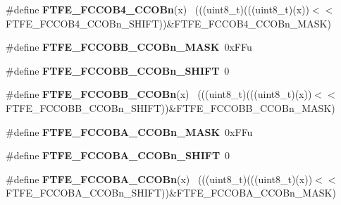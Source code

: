 \begin{DoxyCompactItemize}
\item 
\hypertarget{group___f_t_f_e___register___masks_ga478ea3d4eb6ef73b2492d90c8ad0d42f}{}\#define {\bfseries F\+T\+F\+E\+\_\+\+F\+C\+C\+O\+B4\+\_\+\+C\+C\+O\+Bn}(x)                                      ~(((uint8\+\_\+t)(((uint8\+\_\+t)(x))$<$$<$F\+T\+F\+E\+\_\+\+F\+C\+C\+O\+B4\+\_\+\+C\+C\+O\+Bn\+\_\+\+S\+H\+I\+F\+T))\&F\+T\+F\+E\+\_\+\+F\+C\+C\+O\+B4\+\_\+\+C\+C\+O\+Bn\+\_\+\+M\+A\+S\+K)\label{group___f_t_f_e___register___masks_ga478ea3d4eb6ef73b2492d90c8ad0d42f}

\item 
\hypertarget{group___f_t_f_e___register___masks_ga0c4f10213e785664769dccd3f31c19d9}{}\#define {\bfseries F\+T\+F\+E\+\_\+\+F\+C\+C\+O\+B\+B\+\_\+\+C\+C\+O\+Bn\+\_\+\+M\+A\+S\+K}~0x\+F\+Fu\label{group___f_t_f_e___register___masks_ga0c4f10213e785664769dccd3f31c19d9}

\item 
\hypertarget{group___f_t_f_e___register___masks_ga486d3dca3c7da56602168363f9c474c2}{}\#define {\bfseries F\+T\+F\+E\+\_\+\+F\+C\+C\+O\+B\+B\+\_\+\+C\+C\+O\+Bn\+\_\+\+S\+H\+I\+F\+T}~0\label{group___f_t_f_e___register___masks_ga486d3dca3c7da56602168363f9c474c2}

\item 
\hypertarget{group___f_t_f_e___register___masks_ga3a94ba085389279e61cbaad5b5281322}{}\#define {\bfseries F\+T\+F\+E\+\_\+\+F\+C\+C\+O\+B\+B\+\_\+\+C\+C\+O\+Bn}(x)                                      ~(((uint8\+\_\+t)(((uint8\+\_\+t)(x))$<$$<$F\+T\+F\+E\+\_\+\+F\+C\+C\+O\+B\+B\+\_\+\+C\+C\+O\+Bn\+\_\+\+S\+H\+I\+F\+T))\&F\+T\+F\+E\+\_\+\+F\+C\+C\+O\+B\+B\+\_\+\+C\+C\+O\+Bn\+\_\+\+M\+A\+S\+K)\label{group___f_t_f_e___register___masks_ga3a94ba085389279e61cbaad5b5281322}

\item 
\hypertarget{group___f_t_f_e___register___masks_gacec52ac0397aa60e5278a27225d3506b}{}\#define {\bfseries F\+T\+F\+E\+\_\+\+F\+C\+C\+O\+B\+A\+\_\+\+C\+C\+O\+Bn\+\_\+\+M\+A\+S\+K}~0x\+F\+Fu\label{group___f_t_f_e___register___masks_gacec52ac0397aa60e5278a27225d3506b}

\item 
\hypertarget{group___f_t_f_e___register___masks_gadac1a605014d4879d27ac5a1b5707c5e}{}\#define {\bfseries F\+T\+F\+E\+\_\+\+F\+C\+C\+O\+B\+A\+\_\+\+C\+C\+O\+Bn\+\_\+\+S\+H\+I\+F\+T}~0\label{group___f_t_f_e___register___masks_gadac1a605014d4879d27ac5a1b5707c5e}

\item 
\hypertarget{group___f_t_f_e___register___masks_gafa52ed39f51fb31fcfd179bcdab205ab}{}\#define {\bfseries F\+T\+F\+E\+\_\+\+F\+C\+C\+O\+B\+A\+\_\+\+C\+C\+O\+Bn}(x)                                      ~(((uint8\+\_\+t)(((uint8\+\_\+t)(x))$<$$<$F\+T\+F\+E\+\_\+\+F\+C\+C\+O\+B\+A\+\_\+\+C\+C\+O\+Bn\+\_\+\+S\+H\+I\+F\+T))\&F\+T\+F\+E\+\_\+\+F\+C\+C\+O\+B\+A\+\_\+\+C\+C\+O\+Bn\+\_\+\+M\+A\+S\+K)\label{group___f_t_f_e___register___masks_gafa52ed39f51fb31fcfd179bcdab205ab}


\end{DoxyCompactItemize}
